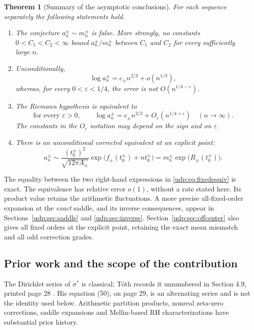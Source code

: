 \documentclass[11pt]{article}
\newtheorem{theorem}{Theorem}[section]
\theoremstyle{remark}\newtheorem{remark}[theorem]{Remark}
\newcommand{\eps}{\varepsilon}
\numberwithin{equation}{section}
\begin{document}
\begin{theorem}[Summary of the asymptotic conclusions]\label{udp:thm:summary}
For each sequence separately the following statements hold.
\begin{enumerate}[label=(\roman*)]
\item The conjecture $a_n^\pm\sim m_n^\pm$ is false. More strongly, no constants $0<C_1<C_2<\infty$ bound $a_n^\pm/m_n^\pm$ between $C_1$ and $C_2$ for every sufficiently large $n$.
\item Unconditionally,
\[
 \log a_n^\pm=c_\pm n^{2/3}+o(n^{1/3}),
\]
whereas, for every $0<\eps<1/4$, the error is not $O(n^{1/4-\eps})$.
\item The Riemann hypothesis is equivalent to
\[
 \text{for every }\eps>0,\qquad
 \log a_n^\pm=c_\pm n^{2/3}+O_\eps(n^{1/4+\eps})
 \quad(n\to\infty).
\]
The constants in the $O_\eps$ notation may depend on the sign and on $\eps$.
\item There is an unconditional corrected equivalent at an explicit point:
\begin{equation}\label{udp:eq:fixedequiv}
 a_n^\pm\sim\frac{(t_0^\pm)^2}{\sqrt{12\pi A_\pm}}
 \exp\bigl(f_\pm(t_0^\pm)+nt_0^\pm\bigr)
 =m_n^\pm\exp\bigl(R_\pm(t_0^\pm)\bigr).
\end{equation}
\end{enumerate}
\end{theorem}
The equality between the two right-hand expressions in \eqref{udp:eq:fixedequiv} is exact. The equivalence has relative error $o(1)$, without a rate stated here. Its product value retains the arithmetic fluctuations. A more precise all-fixed-order expansion at the \emph{exact} saddle, and its inverse consequences, appear in Sections~\ref{udp:sec:saddle} and \ref{udp:sec:inverse}. Section~\ref{udp:sec:offcenter} also gives all fixed orders at the explicit point, retaining the exact mean mismatch and all odd correction grades.

\subsection{Prior work and the scope of the contribution}\label{udp:sec:prior}
The Dirichlet series of $\sigma^*$ is classical; T\'oth records it unnumbered in Section 4.9, printed page 28 \cite{toth}. His equation (50), on page 29, is an alternating series and is not the identity used below. Arithmetic partition products, nonreal zeta-zero corrections, saddle expansions and Mellin-based RH characterizations have substantial prior history.
\end{document}
